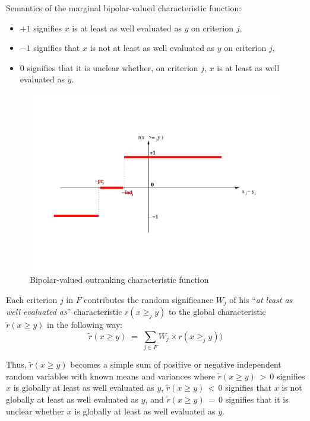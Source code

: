 Semantics of the marginal bipolar-valued characteristic function:
\begin{itemize}[topsep=1pt]
\item $+1$ signifies $x$ is at least as well evaluated as $y$ on criterion $j$,
\item $-1$ signifies that $x$ is not at least as well evaluated as $y$ on criterion $j$,
\item $0$ signifies that it is unclear whether, on criterion $j$, $x$ is at least as well evaluated as $y$.
\end{itemize}
\begin{figure}[ht]
\includegraphics[width=\hsize]{Figures/18-2-rCharacteristic.pdf}
\caption{Bipolar-valued outranking characteristic function}
\label{fig:18.2}       %
\end{figure}

Each criterion $j$ in $F$ contributes the random significance $W_j$ of his ``\emph{at least as well evaluated as}'' characteristic $r(x \geq_j y)$ to the global characteristic $\tilde{r}(x \geq y)$ in the following way:
\begin{equation}
      \tilde{r}(x \geq y) \; = \; \sum_{j \in F} W_j \times r(x \geq_j y) )
\end{equation}

Thus, $\tilde{r}(x \geq y)$ becomes a simple sum of positive or negative independent random variables with known means and variances where $\tilde{r}(x \geq y) \, > \, 0$ signifies $x$ is globally at least as well evaluated as $y$, $\tilde{r}(x \geq y) \, < \, 0$ signifies that $x$ is not globally at least as well evaluated as $y$, and $\tilde{r}(x \geq y)\,=\,0$ signifies that it is unclear whether $x$ is globally at least as well evaluated as $y$.

